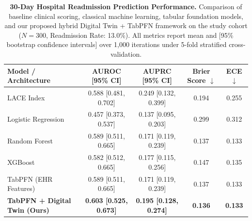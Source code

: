 \begin{table}[t]
\centering
\caption{\textbf{30-Day Hospital Readmission Prediction Performance.} Comparison of baseline clinical scoring, classical machine learning, tabular foundation models, and our proposed hybrid Digital Twin + TabPFN framework on the study cohort ($N=300$, Readmission Rate: 13.0\%). All metrics report mean and [95\% bootstrap confidence intervals] over 1,000 iterations under 5-fold stratified cross-validation.}
\label{tab:main_results}
\vspace{2mm}
\begin{tabular}{lcccc}
\toprule
\textbf{Model / Architecture} & \textbf{AUROC [95\% CI]} & \textbf{AUPRC [95\% CI]} & \textbf{Brier Score $\downarrow$} & \textbf{ECE $\downarrow$} \\
\midrule
LACE Index & 0.588 [0.481, 0.702] & 0.249 [0.132, 0.399] & 0.194 & 0.255 \\
Logistic Regression & 0.457 [0.373, 0.537] & 0.137 [0.095, 0.203] & 0.299 & 0.312 \\
Random Forest & 0.589 [0.511, 0.665] & 0.171 [0.119, 0.239] & 0.137 & 0.133 \\
XGBoost & 0.582 [0.512, 0.665] & 0.177 [0.115, 0.256] & 0.147 & 0.135 \\
TabPFN (EHR Features) & 0.589 [0.511, 0.665] & 0.171 [0.119, 0.239] & 0.137 & 0.133 \\
\textbf{TabPFN + Digital Twin (Ours)} & \textbf{0.603 [0.525, 0.673]} & \textbf{0.195 [0.128, 0.274]} & \textbf{0.136} & \textbf{0.133} \\
\bottomrule
\end{tabular}
\end{table}